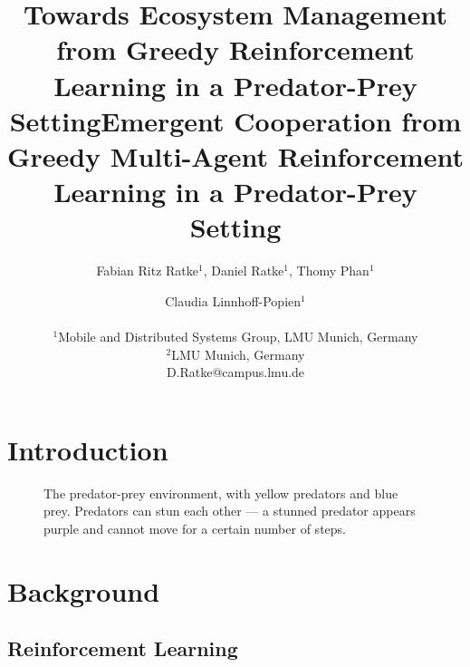 \documentclass[letterpaper]{article}
\title{Towards Ecosystem Management from Greedy Reinforcement Learning in a Predator-Prey Setting}
\title{Emergent Cooperation from Greedy Multi-Agent Reinforcement Learning in a Predator-Prey Setting}
\author{Fabian Ritz Ratke$^{1}$, Daniel Ratke$^{1}$, Thomy Phan$^1$ \and Claudia Linnhoff-Popien$^1$ \\
\mbox{}\\
$^1$Mobile and Distributed Systems Group, LMU Munich, Germany \\
$^2$LMU Munich, Germany \\
D.Ratke@campus.lmu.de} %
\begin{document}
\maketitle

\begin{abstract}
    \blindtext[2]
\end{abstract}

\section{Introduction}

\blindtext[4]

\begin{figure}%
    \centering
    \caption{The predator-prey environment, with yellow predators and blue prey. Predators can stun each other --- a stunned predator appears purple and cannot move for a certain number of steps.}%
    \label{fig:aquarium}%
\end{figure}

\section{Background}

\subsection{Reinforcement Learning}

\blindtext[2]
\end{document}
